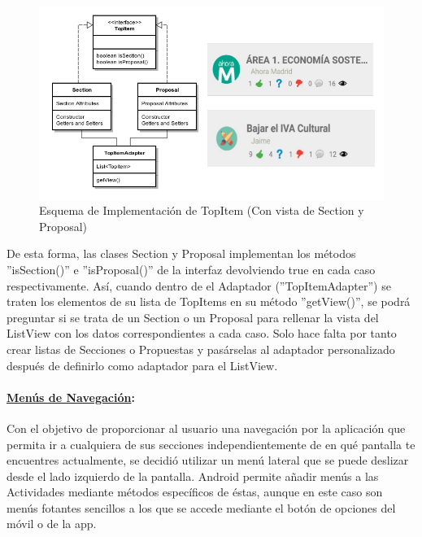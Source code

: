 	\begin{figure}[!]
	  \centering
	    \includegraphics[keepaspectratio, scale=0.6]{Media/Diagrams/classDiagramTopItemAdapter.png}
	  \caption{Esquema de Implementación de TopItem (Con vista de Section y Proposal)}
	  \label{fig:topItemArch}
	\end{figure}
	
	De esta forma, las clases Section y Proposal implementan los métodos ''isSection()'' e ''isProposal()'' de la interfaz devolviendo true en cada caso respectivamente. Así, cuando dentro de el Adaptador (''TopItemAdapter'') se traten los elementos de su lista de TopItems en su método ''getView()'', se podrá preguntar si se trata de un Section o un Proposal para rellenar la vista del ListView con los datos correspondientes a cada caso. Solo hace falta por tanto crear listas de Secciones o Propuestas y pasárselas al adaptador personalizado después de definirlo como adaptador para el ListView. \\
		
		\paragraph{\underline{Menús de Navegación}:}
		
		Con el objetivo de proporcionar al usuario una navegación por la aplicación que permita ir a cualquiera de sus secciones independientemente de en qué pantalla te encuentres actualmente, se decidió utilizar un menú lateral que se puede deslizar desde el lado izquierdo de la pantalla. Android permite añadir menús \cite{ref:android_menu} a las Actividades mediante métodos específicos de éstas, aunque en este caso son menús fotantes sencillos a los que se accede mediante el botón de opciones del móvil o de la app. 
		
